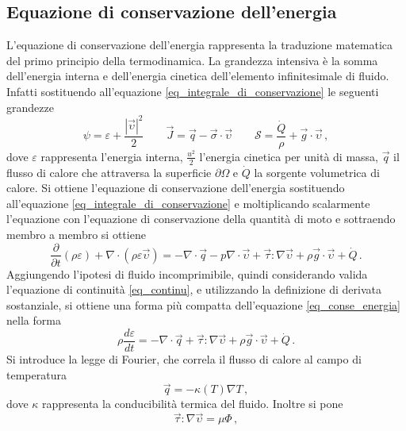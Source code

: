 \subsection{Equazione di conservazione dell'energia}
L'equazione di conservazione dell'energia rappresenta la traduzione matematica 
del primo principio della termodinamica. 
La grandezza intensiva è la somma dell'energia interna e dell'energia cinetica 
dell'elemento infinitesimale di fluido. Infatti sostituendo all'equazione 
\eqref{eq_integrale_di_conservazione} le seguenti grandezze
\begin{equation}
\psi= \varepsilon+\frac{|\vec{\upsilon}|^2}{2} \qquad 
\vec{J}=\vec{q}-\vec{\sigma}\cdot \vec{\upsilon} \qquad 
\mathcal{S}=\frac{\dot{Q}}{\rho}+\vec{g}\cdot\vec{\upsilon} \,,
\end{equation}
dove $\varepsilon$ rappresenta l'energia interna, $\frac{u^2}{2}$ l'energia 
cinetica per unità di massa, $\vec{q}$ il flusso di calore che attraversa la 
superficie $\partial \Omega$ e $\dot{Q}$ la sorgente volumetrica di calore.
Si ottiene l'equazione di conservazione dell'energia sostituendo all'equazione 
\eqref{eq_integrale_di_conservazione} e moltiplicando scalarmente l'equazione 
con l'equazione di conservazione della quantità di moto e sottraendo membro a 
membro si ottiene
\begin{equation}
\label{eq_conse_energia}
 \frac{\partial}{\partial t}(\rho \varepsilon) + \nabla \cdot (\rho \varepsilon 
\vec{\upsilon}) = -\nabla \cdot \vec{q} - p \nabla \cdot \vec{\upsilon} + 
\vec{\tau} : \nabla \vec{\upsilon}+ \rho \vec{g}\cdot \vec{\upsilon} + \dot{Q} 
\, .
\end{equation}
Aggiungendo l'ipotesi di fluido incomprimibile, quindi considerando valida 
l'equazione di continuità \eqref{eq_continu}, e utilizzando la definizione di 
derivata sostanziale, si ottiene una forma più compatta dell'equazione 
\eqref{eq_conse_energia} nella forma
\begin{equation}
 \rho \frac{d\varepsilon}{dt}= - \nabla \cdot \vec{q} + 
\vec{\tau}:\nabla\vec{\upsilon}+ \rho \vec{g}\cdot \vec{\upsilon} + \dot{Q}\,.
\end{equation}
Si introduce la legge di Fourier, che correla il flusso di calore al campo di 
temperatura
\begin{equation}
 \vec{q} = - \kappa(T)\nabla T \,,
\end{equation}
dove $\kappa$ rappresenta la conducibilità termica del fluido.
Inoltre si pone 
\begin{equation}
 \vec{\tau} : \nabla \vec{\upsilon} = \mu\Phi \,,
\end{equation}
